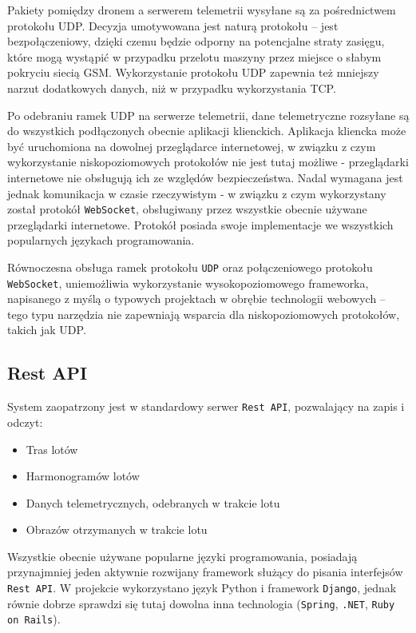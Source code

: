 Pakiety pomiędzy dronem a serwerem telemetrii wysyłane są za pośrednictwem protokołu
UDP. Decyzja umotywowana jest naturą protokołu -- jest bezpołączeniowy, dzięki
czemu będzie odporny na potencjalne straty zasięgu, które mogą wystąpić w przypadku
przelotu maszyny przez miejsce o słabym pokryciu siecią GSM. Wykorzystanie protokołu
UDP zapewnia też mniejszy narzut dodatkowych danych, niż w przypadku wykorzystania
TCP.

Po odebraniu ramek UDP na serwerze telemetrii, dane telemetryczne rozsyłane są do
wszystkich podłączonych obecnie aplikacji klienckich. Aplikacja kliencka może
być uruchomiona na dowolnej przeglądarce internetowej, w związku z czym wykorzystanie
niskopoziomowych protokołów nie jest tutaj możliwe - przeglądarki internetowe nie 
obsługują ich ze względów bezpieczeństwa. Nadal wymagana jest jednak komunikacja
w czasie rzeczywistym - w związku z czym wykorzystany został protokół \texttt{WebSocket},
obsługiwany przez wszystkie obecnie używane przeglądarki internetowe. Protokół posiada
swoje implementacje we wszystkich popularnych językach programowania. 

Równoczesna obsługa ramek protokołu \texttt{UDP} oraz połączeniowego protokołu 
\texttt{WebSocket}, uniemożliwia wykorzystanie wysokopoziomowego frameworka,
napisanego z myślą o typowych projektach w obrębie technologii webowych --
tego typu narzędzia nie zapewniają wsparcia dla niskopoziomowych protokołów,
takich jak UDP.


\subsection{Rest API}

System zaopatrzony jest w standardowy serwer
\texttt{Rest API}\cite{principled_design_of_modern_web_apps},
pozwalający na zapis i odczyt:

\begin{itemize}
	\item Tras lotów
	\item Harmonogramów lotów
	\item Danych telemetrycznych, odebranych w trakcie lotu
	\item Obrazów otrzymanych w trakcie lotu
\end{itemize}

Wszystkie obecnie używane popularne języki programowania,
posiadają przynajmniej jeden aktywnie rozwijany framework 
służący do pisania interfejsów \texttt{Rest API}. W projekcie
wykorzystano język Python i framework \texttt{Django},
jednak równie dobrze sprawdzi się tutaj dowolna inna technologia
(\texttt{Spring}, \texttt{.NET}, \texttt{Ruby on Rails}).

